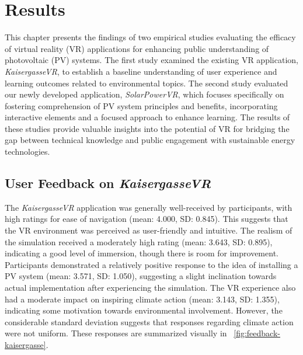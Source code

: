 \documentclass[draft, final]{vutinfth} %
\begin{document}

 
\chapter{Results}

This chapter presents the findings of two empirical studies evaluating the efficacy of virtual reality (VR) applications for enhancing public understanding of photovoltaic (PV) systems. The first study examined the existing VR application, \textit{KaisergasseVR}, to establish a baseline understanding of user experience and learning outcomes related to environmental topics. The second study evaluated our newly developed application, \textit{SolarPowerVR}, which focuses specifically on fostering comprehension of PV system principles and benefits, incorporating interactive elements and a focused approach to enhance learning. The results of these studies provide valuable insights into the potential of VR for bridging the gap between technical knowledge and public engagement with sustainable energy technologies.

\section{User Feedback on \textit{KaisergasseVR}} \label{sec:kaisergasse-feedback}

The \textit{KaisergasseVR} application was generally well-received by participants, with high ratings for ease of navigation (mean: 4.000, SD: 0.845). This suggests that the VR environment was perceived as user-friendly and intuitive. The realism of the simulation received a moderately high rating (mean: 3.643, SD: 0.895), indicating a good level of immersion, though there is room for improvement. Participants demonstrated a relatively positive response to the idea of installing a PV system (mean: 3.571, SD: 1.050), suggesting a slight inclination towards actual implementation after experiencing the simulation.  The VR experience also had a moderate impact on inspiring climate action (mean: 3.143, SD: 1.355), indicating some motivation towards environmental involvement. However, the considerable standard deviation suggests that responses regarding climate action were not uniform.
These responses are summarized visually in \figurename~\ref{fig:feedback-kaisergasse}.
\end{document}
